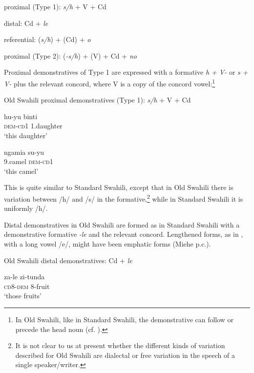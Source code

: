 \documentclass[output=paper]{langscibook}
\begin{document}
    \ea\label{ex:marten:13a} proximal (Type 1): \textit{s/h} + V + Cd

    \ex\label{ex:marten:13b} distal: Cd + \textit{le~}

    \ex\label{ex:marten:13c} referential: (\textit{s/h}) + (Cd) + \textit{o}~

    \ex\label{ex:marten:13d} proximal (Type 2): (\textit{{}-s/h}) + (V) + Cd + \textit{no}
    \z
\z

Proximal demonstratives of Type 1 are expressed with a formative \textit{h + V-} or \textit{s + V-} plus the relevant concord, where V is a copy of the concord vowel:\footnote{In Old Swahili, like in Standard Swahili, the demonstrative can follow or precede the head noun (cf. \citealt{Rugemalira2007, VandeVelde2005}).}

\ea\label{ex:marten:14}
Old Swahili proximal demonstratives (Type 1): \textit{s/h} + V + Cd

    \ea\label{ex:marten:14a} \gll hu-yu     binti\\
    \textsc{dem}{}-\textsc{cd}1  1.daughter\\
    \glt ‘this daughter’ \citep[143]{Miehe1979}

    \ex\label{ex:marten:14b} \gll  ngamia    su-yu \\
    \textsc{9.}camel     \textsc{dem}{}-\textsc{cd}1\\
    \glt ‘this camel’ \citep[142]{Miehe1979}
    \z
\z

This is quite similar to Standard Swahili, except that in Old Swahili there is variation between /h/ and /s/ in the formative,\footnote{It is not clear to us at present whether the different kinds of variation described for Old Swahili are dialectal or free variation in the speech of a single speaker/writer.}  while in Standard Swahili it is uniformly /h/.


  Distal demonstratives in Old Swahili are formed as in Standard Swahili with a demonstrative formative \textit{{}-le} and the relevant concord. Lengthened forms, as in , with a long vowel /e/, might have been emphatic forms (Miehe p.c.).

\newpage
\ea\label{ex:marten:15} 
Old Swahili distal demonstratives: Cd + \textit{le~} 

    \ea\label{ex:marten:15a} \gll  za-le         zi-tunda \\
    \textsc{cd}8-\textsc{dem}    8-fruit\\
    \glt ‘those fruits’ \citep[138]{Miehe1979}
\end{document}
